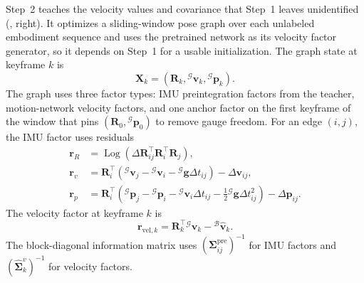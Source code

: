 Step~2 teaches the velocity values and covariance that Step~1 leaves unidentified (, right).
It optimizes a sliding-window pose graph over each unlabeled embodiment sequence and uses the pretrained network as its velocity factor generator, so it depends on Step~1 for a usable initialization.
The graph state at keyframe $k$ is
\begin{equation}
\mathbf{X}_k=(\mathbf{R}_k,{}^\mathcal{G}\mathbf{v}_k,{}^\mathcal{G}\mathbf{p}_k).
\end{equation}
The graph uses three factor types: IMU preintegration factors from the teacher, motion-network velocity factors, and one anchor factor on the first keyframe of the window that pins $(\mathbf{R}_0,{}^\mathcal{G}\mathbf{p}_0)$ to remove gauge freedom.
For an edge $(i,j)$, the IMU factor uses residuals
\begin{equation}
\begin{split}
\mathbf{r}_R &= \operatorname{Log}(\Delta\mathbf{R}_{ij}^{\top}\mathbf{R}_i^{\top}\mathbf{R}_j),\\
\mathbf{r}_v &= \mathbf{R}_i^{\top}({}^\mathcal{G}\mathbf{v}_j-{}^\mathcal{G}\mathbf{v}_i-{}^\mathcal{G}\mathbf{g}\Delta t_{ij})-\Delta\mathbf{v}_{ij},\\
\mathbf{r}_p &= \mathbf{R}_i^{\top}({}^\mathcal{G}\mathbf{p}_j-{}^\mathcal{G}\mathbf{p}_i-{}^\mathcal{G}\mathbf{v}_i\Delta t_{ij}-\tfrac{1}{2}{}^\mathcal{G}\mathbf{g}\Delta t_{ij}^{2})-\Delta\mathbf{p}_{ij}.
\end{split}
\end{equation}
The velocity factor at keyframe $k$ is
\begin{equation}
\mathbf{r}_{\mathrm{vel},k}=\mathbf{R}_k^\top{}^\mathcal{G}\mathbf{v}_k-{}^\mathcal{B}\hat{\mathbf{v}}_k.
\end{equation}
The block-diagonal information matrix uses $(\boldsymbol{\Sigma}^{\mathrm{pre}}_{ij})^{-1}$ for IMU factors and $(\hat{\boldsymbol{\Sigma}}^v_k)^{-1}$ for velocity factors.

